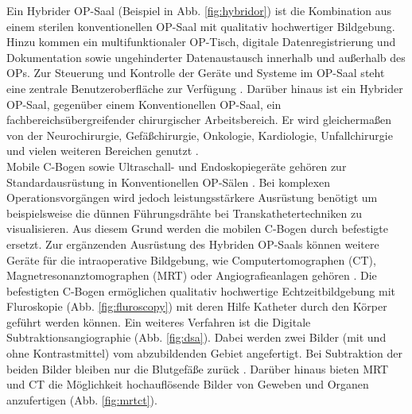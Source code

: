 Ein Hybrider OP-Saal (Beispiel in Abb. \ref{fig:hybridor}) ist die Kombination aus einem sterilen konventionellen OP-Saal mit qualitativ hochwertiger Bildgebung. Hinzu kommen ein multifunktionaler OP-Tisch, digitale Datenregistrierung und Dokumentation sowie ungehinderter Datenaustausch innerhalb und außerhalb des OPs. Zur Steuerung und Kontrolle der Geräte und Systeme im OP-Saal steht eine zentrale Benutzeroberfläche zur Verfügung \cite{HybriderVsKonventioneller,KarlStorz}. Darüber hinaus ist ein Hybrider OP-Saal, gegenüber einem Konventionellen OP-Saal, ein fachbereichsübergreifender chirurgischer Arbeitsbereich. Er wird gleichermaßen von der Neurochirurgie, Gefäßchirurgie, Onkologie, Kardiologie, Unfallchirurgie und vielen weiteren Bereichen genutzt \cite{Getinge}.\\
Mobile C-Bogen sowie Ultraschall- und Endoskopiegeräte gehören zur Standardausrüstung in Konventionellen OP-Sälen \cite{TechnicalConsiderations}. Bei komplexen Operationsvorgängen wird jedoch leistungsstärkere Ausrüstung benötigt um beispielsweise die dünnen Führungsdrähte bei Transkathetertechniken zu visualisieren. Aus diesem Grund werden die mobilen C-Bogen durch befestigte ersetzt. Zur ergänzenden Ausrüstung des Hybriden OP-Saals können weitere Geräte für die intraoperative Bildgebung, wie Computertomographen (CT), Magnetresonanztomographen (MRT) oder Angiografieanlagen gehören \cite{OPderZukunft}. 
Die befestigten C-Bogen ermöglichen qualitativ hochwertige Echtzeitbildgebung mit Fluroskopie (Abb. \ref{fig:fluroscopy}) mit deren Hilfe Katheter durch den Körper geführt werden können. Ein weiteres Verfahren ist die Digitale Subtraktionsangiographie (Abb. \ref{fig:dsa}). Dabei werden zwei Bilder (mit und ohne Kontrastmittel) vom abzubildenden Gebiet angefertigt. Bei Subtraktion der beiden Bilder bleiben nur die Blutgefäße zurück \cite{CurrentAndFuture}. Darüber hinaus bieten MRT und CT die Möglichkeit hochauflösende Bilder von Geweben und Organen anzufertigen (Abb. \ref{fig:mrtct}).\\


